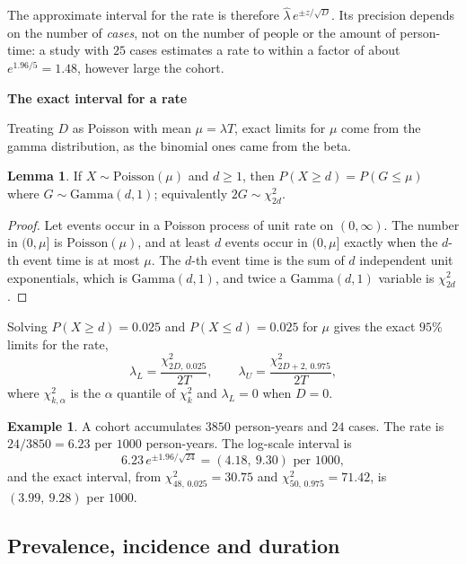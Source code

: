 \documentclass[11pt,a4paper]{article}
\numberwithin{equation}{section}
\theoremstyle{definition}
\newtheorem{exa}[thm]{Example}
\newtheorem{lem}[thm]{Lemma}
\newcommand{\subhead}[1]{%
  \par\medskip\noindent\textbf{#1}\par\nobreak\smallskip}
\begin{document}
The approximate interval for the rate is therefore $\hat\lambda\, e^{\pm z/\sqrt D}$. Its precision depends on the number of \emph{cases}, not on the
number of people or the amount of person-time: a study with $25$ cases estimates a rate to within a factor of about $e^{1.96/5} = 1.48$,
however large the cohort.

\subhead{The exact interval for a rate}

Treating $D$ as Poisson with mean $\mu = \lambda T$, exact limits for $\mu$ come from the gamma distribution, as the binomial ones came from the beta.

\begin{lem}
\label{lem:poisgamma}
If $X \sim \text{Poisson}(\mu)$ and $d \geq 1$, then $P(X \geq d) = P(G \leq \mu)$ where $G \sim \text{Gamma}(d, 1)$; equivalently $2G \sim \chi^2_{2d}$.
\end{lem}

\begin{proof}
Let events occur in a Poisson process of unit rate on $(0, \infty)$. The number in $(0, \mu]$ is $\text{Poisson}(\mu)$, and at least $d$ events occur in
$(0, \mu]$ exactly when the $d$-th event time is at most $\mu$. The $d$-th event time is the sum of $d$ independent unit exponentials, which is
$\text{Gamma}(d, 1)$, and twice a $\text{Gamma}(d, 1)$ variable is $\chi^2_{2d}$.
\end{proof}

Solving $P(X \geq d) = 0.025$ and $P(X \leq d) = 0.025$ for $\mu$ gives the exact $95\%$ limits for the rate,
\begin{equation}
\label{eq:exactrate}
\lambda_L = \frac{\chi^2_{2D,\,0.025}}{2T}, \qquad \lambda_U = \frac{\chi^2_{2D + 2,\,0.975}}{2T} ,
\end{equation}
where $\chi^2_{k,\alpha}$ is the $\alpha$ quantile of $\chi^2_k$ and $\lambda_L = 0$ when $D = 0$.

\begin{exa}
\label{exa:rateci}
A cohort accumulates $3850$ person-years and $24$ cases. The rate is $24/3850 = 6.23$ per $1000$ person-years. The log-scale interval is
\[
6.23\, e^{\pm 1.96/\sqrt{24}} = (4.18,\ 9.30) \text{ per } 1000 ,
\]
and the exact interval, from $\chi^2_{48,\,0.025} = 30.75$ and $\chi^2_{50,\,0.975} = 71.42$, is $(3.99,\ 9.28)$ per $1000$.
\end{exa}

\subsection{Prevalence, incidence and duration}
\label{sec:prevdur}
\end{document}
